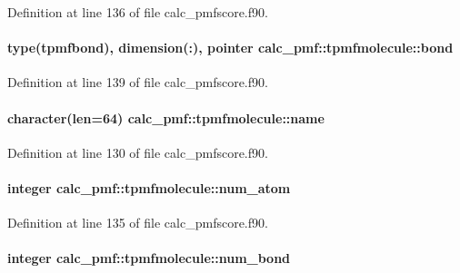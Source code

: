 Definition at line 136 of file calc\-\_\-pmfscore.\-f90.

\hypertarget{structcalc__pmf_1_1tpmfmolecule_aa3588cae0c81e558dc6f3ba3bc5ac875}{
\paragraph[{bond}]{\setlength{\rightskip}{0pt plus 5cm}type({\bf tpmfbond}), dimension(\-:), pointer calc\-\_\-pmf\-::tpmfmolecule\-::bond}}\label{structcalc__pmf_1_1tpmfmolecule_aa3588cae0c81e558dc6f3ba3bc5ac875}


Definition at line 139 of file calc\-\_\-pmfscore.\-f90.

\hypertarget{structcalc__pmf_1_1tpmfmolecule_a33ac887bdcf3e77747d22c54deae7d32}{
\paragraph[{name}]{\setlength{\rightskip}{0pt plus 5cm}character(len=64) calc\-\_\-pmf\-::tpmfmolecule\-::name}}\label{structcalc__pmf_1_1tpmfmolecule_a33ac887bdcf3e77747d22c54deae7d32}


Definition at line 130 of file calc\-\_\-pmfscore.\-f90.

\hypertarget{structcalc__pmf_1_1tpmfmolecule_aff70a81d959ec2f5fc4443b471a8de51}{
\paragraph[{num\-\_\-atom}]{\setlength{\rightskip}{0pt plus 5cm}integer calc\-\_\-pmf\-::tpmfmolecule\-::num\-\_\-atom}}\label{structcalc__pmf_1_1tpmfmolecule_aff70a81d959ec2f5fc4443b471a8de51}


Definition at line 135 of file calc\-\_\-pmfscore.\-f90.

\hypertarget{structcalc__pmf_1_1tpmfmolecule_a3cb71e2ec827dedb9f45c9bfa5d434eb}{
\paragraph[{num\-\_\-bond}]{\setlength{\rightskip}{0pt plus 5cm}integer calc\-\_\-pmf\-::tpmfmolecule\-::num\-\_\-bond}}\label{structcalc__pmf_1_1tpmfmolecule_a3cb71e2ec827dedb9f45c9bfa5d434eb}


